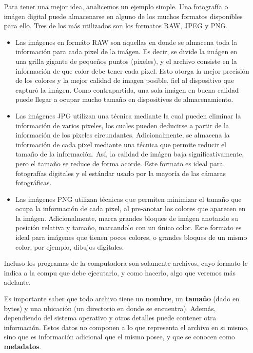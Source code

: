 Para tener una mejor idea, analicemos un ejemplo simple. Una fotografía o imágen
digital puede almacenarse en alguno de los muchos formatos disponibles para ello.
Tres de los más utilizados son los formatos RAW, JPEG y PNG.
\begin{itemize}
    \item Las imágenes en formáto RAW son aquellas en donde se almacena toda la
        información para cada pixel de la imágen. Es decir, se divide la imágen
        en una grilla gigante de pequeños puntos (pixeles), y el archivo consiste
        en la información de que color debe tener cada pixel. Esto otorga la
        mejor precisión de los colores y la mejor calidad de imagen posible, fiel
        al dispositivo que capturó la imágen. Como contrapartida, una sola imágen
        en buena calidad puede llegar a ocupar mucho tamaño en dispositivos de
        almacenamiento.
    \item Las imágenes JPG utilizan una técnica mediante la cual pueden eliminar
        la información de varios pixeles, los cuales pueden deducirse a partir de
        la información de los pixeles circundantes. Adicionalmente, se almacena
        la información de cada pixel mediante una técnica que permite reducir
        el tamaño de la información. Así, la calidad de imágen baja
        significativamente, pero el tamaño se reduce de forma acorde. Este formato
        es ideal para fotografías digitales y el estándar usado por la mayoría
        de las cámaras fotográficas.
    \item Las imágenes PNG utilizan técnicas que permiten minimizar el tamaño que
        ocupa la información de cada pixel, al pre-anotar los colores que aparecen
        en la imágen. Adicionalmente, marca grandes bloques de imágen anotando su
        posición relativa y tamaño, marcandolo con un único color. Este formato es
        ideal para imágenes que tienen pocos colores, o grandes bloques de un
        mismo color, por ejemplo, dibujos digitales.
\end{itemize}

Incluso los programas de la computadora son solamente archivos, cuyo formato
le indica a la compu que debe ejecutarlo, y como hacerlo, algo que veremos más
adelante.

Es importante saber que todo archivo tiene un \textbf{nombre}, un \textbf{tamaño}
(dado en bytes) y una ubicación (un directorio en donde se encuentra). Además,
dependiendo del sistema operativo y otros detalles puede contener otra información.
Estos datos no componen a lo que representa el archivo en si mismo, sino que es
información adicional que el mismo posee, y que se conocen como \textbf{metadatos}.

